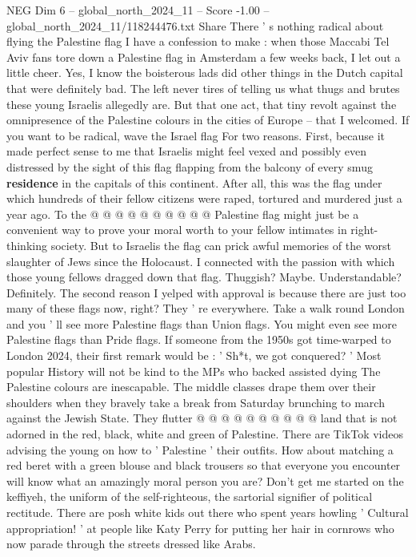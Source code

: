 \begin{textsample}{NEG Dim 6 – global\_north\_2024\_11 – Score -1.00 – global\_north\_2024\_11/118244476.txt}  \label{ex:f6_neg_101}
Share There ' s nothing radical about flying the Palestine flag I have a confession to make : when those Maccabi Tel Aviv fans tore down a Palestine flag in Amsterdam a few weeks back, I let out a little cheer.
Yes, I know the boisterous lads did other things in the Dutch capital that were definitely bad.
The left never tires of telling us what thugs and brutes these young Israelis allegedly are.
But that one act, that tiny revolt against the omnipresence of the Palestine colours in the cities of Europe -- that I welcomed.
If you want to be radical, wave the Israel flag For two reasons.
First, because it made perfect sense to me that Israelis might feel vexed and possibly even distressed by the sight of this flag flapping from the balcony of every smug \textbf{residence} in the capitals of this continent.
After all, this was the flag under which hundreds of their fellow citizens were raped, tortured and murdered just a year ago.
To the @ @ @ @ @ @ @ @ @ @ Palestine flag might just be a convenient way to prove your moral worth to your fellow intimates in right-thinking society.
But to Israelis the flag can prick awful memories of the worst slaughter of Jews since the Holocaust.
I connected with the passion with which those young fellows dragged down that flag.
Thuggish?
Maybe.
Understandable?
Definitely.
The second reason I yelped with approval is because there are just too many of these flags now, right?
They ' re everywhere.
Take a walk round London and you ' ll see more Palestine flags than Union flags.
You might even see more Palestine flags than Pride flags.
If someone from the 1950s got time-warped to London 2024, their first remark would be : ' Sh*t, we got conquered? ' Most popular History will not be kind to the MPs who backed assisted dying The Palestine colours are inescapable.
The middle classes drape them over their shoulders when they bravely take a break from Saturday brunching to march against the Jewish State.
They flutter @ @ @ @ @ @ @ @ @ @ land that is not adorned in the red, black, white and green of Palestine.
There are TikTok videos advising the young on how to ' Palestine ' their outfits.
How about matching a red beret with a green blouse and black trousers so that everyone you encounter will know what an amazingly moral person you are?
Don't get me started on the keffiyeh, the uniform of the self-righteous, the sartorial signifier of political rectitude.
There are posh white kids out there who spent years howling ' Cultural appropriation! ' at people like Katy Perry for putting her hair in cornrows who now parade through the streets dressed like Arabs.

\end{textsample}

